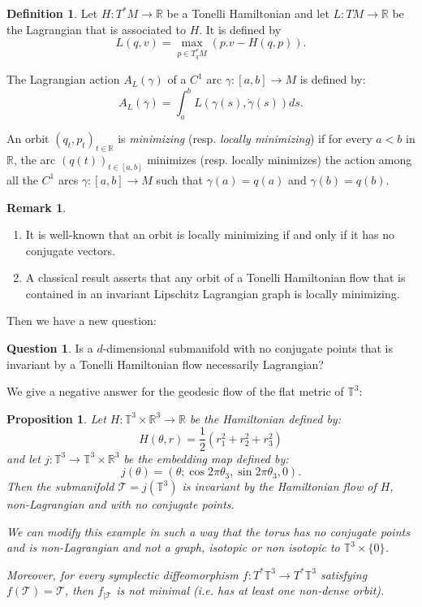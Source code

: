 \documentclass{dcds}
\newtheorem{proposition}{Proposition}
\theoremstyle{definition}
\newtheorem{definition}[theorem]{Definition}
\newtheorem{remark}{Remark}
\newtheorem{ques}{Question}
\begin{document}
\begin{definition}
Let $H:T^*M\rightarrow {\mathbb {R}}$ be a Tonelli Hamiltonian and  let $L: TM\rightarrow {\mathbb {R}}$ be  the Lagrangian that is associated to  $H$. It is defined by $$\displaystyle{L(q, v)=\max_{p\in T^*_qM} (p.v-H(q,p))}.$$

The Lagrangian action $A_L(\gamma )$ of a $C^1$ arc $\gamma: [a, b]\rightarrow M$ is defined by:
$$A_L(\gamma )=\int_a^bL(\gamma (s), \dot\gamma (s))ds.$$
\medskip

An orbit $(q_t, p_t)_{t\in{\mathbb {R}}}$ is {\em minimizing} (resp. {\em locally minimizing}) if for every $a<b$ in ${\mathbb {R}}$, the arc $(q(t))_{t\in[a, b]}$ minimizes (resp. locally minimizes) the action among all the $C^1$ arcs $\gamma: [a, b]\rightarrow M$ such that $\gamma(a)=q(a)$ and $\gamma(b)=q(b)$.
\end{definition}

\begin{remark}
\begin{enumerate}
\item It is well-known that an orbit is locally minimizing if and only if it has no conjugate vectors.
\item A classical result asserts that any orbit of a Tonelli Hamiltonian flow that is contained in an invariant Lipschitz Lagrangian graph is locally minimizing.
\end{enumerate}
\end{remark}
 Then we have a new  question:

 \begin{ques}
 Is a   $d$-dimensional submanifold with no conjugate points that is invariant by a Tonelli Hamiltonian flow necessarily  Lagrangian?
 \end{ques}
We  give a negative answer for the geodesic flow of the flat metric of ${\mathbb {T}}^3$:
\begin{proposition}\label{P1}
Let $H:{\mathbb {T}}^3\times {\mathbb {R}}^3\rightarrow {\mathbb {R}}$ be the Hamiltonian defined by:
$$H(\theta, r)=\frac{1}{2}(r_1^2+r_2^2+r_3^2) $$
and let $j:{\mathbb {T}}^3\rightarrow {\mathbb {T}}^3\times{\mathbb {R}}^3$ be the embedding map defined by:
$$j(\theta)=(\theta; \cos 2\pi\theta_3,\sin 2\pi\theta_3, 0).$$
Then the submanifold ${\mathcal {T}}=j({\mathbb {T}}^3)$ is invariant by the Hamiltonian flow of $H$, non-Lagrangian and with no conjugate points.

We can modify this example in such a way that the torus has no conjugate points and is non-Lagrangian and not a graph, isotopic or non isotopic to ${\mathbb {T}}^3\times \{ 0\}$.

Moreover, for every symplectic diffeomorphism $f:T^* {\mathbb {T}}^3 \rightarrow T^*{\mathbb {T}}^3$ satisfying $f({\mathcal {T}})={\mathcal {T}}$, then $f_{|{\mathcal {T}}} $ is not minimal (i.e. has at least one non-dense orbit).

\end{proposition}
\end{document}
